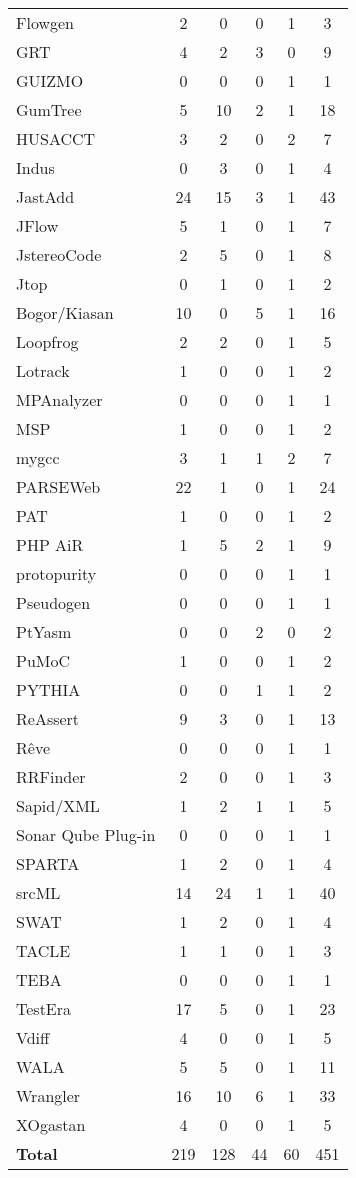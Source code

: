 \begin{longtable}{ l c c c c c }
   Flowgen & 2 & 0 & 0 & 1 & 3 \\
   GRT & 4 & 2 & 3 & 0 & 9 \\
   GUIZMO & 0 & 0 & 0 & 1 & 1 \\
   GumTree & 5 & 10 & 2 & 1 & 18 \\
   HUSACCT & 3 & 2 & 0 & 2 & 7 \\
   Indus & 0 & 3 & 0 & 1 & 4 \\
   JastAdd & 24 & 15 & 3 & 1 & 43 \\
   JFlow & 5 & 1 & 0 & 1 & 7 \\
   JstereoCode & 2 & 5 & 0 & 1 & 8 \\
   Jtop & 0 & 1 & 0 & 1 & 2 \\
   Bogor/Kiasan & 10 & 0 & 5 & 1 & 16 \\
   Loopfrog & 2 & 2 & 0 & 1 & 5 \\
   Lotrack & 1 & 0 & 0 & 1 & 2 \\
   MPAnalyzer & 0 & 0 & 0 & 1 & 1 \\
   MSP & 1 & 0 & 0 & 1 & 2 \\
   mygcc & 3 & 1 & 1 & 2 & 7 \\
   PARSEWeb & 22 & 1 & 0 & 1 & 24 \\
   PAT & 1 & 0 & 0 & 1 & 2 \\
   PHP AiR & 1 & 5 & 2 & 1 & 9 \\
   protopurity & 0 & 0 & 0 & 1 & 1 \\
   Pseudogen & 0 & 0 & 0 & 1 & 1 \\
   PtYasm & 0 & 0 & 2 & 0 & 2 \\
   PuMoC & 1 & 0 & 0 & 1 & 2 \\
   PYTHIA & 0 & 0 & 1 & 1 & 2 \\
   ReAssert & 9 & 3 & 0 & 1 & 13 \\
   Rêve & 0 & 0 & 0 & 1 & 1 \\
   RRFinder & 2 & 0 & 0 & 1 & 3 \\
   Sapid/XML & 1 & 2 & 1 & 1 & 5 \\
   Sonar Qube Plug-in & 0 & 0 & 0 & 1 & 1 \\
   SPARTA & 1 & 2 & 0 & 1 & 4 \\
   srcML & 14 & 24 & 1 & 1 & 40 \\
   SWAT & 1 & 2 & 0 & 1 & 4 \\
   TACLE & 1 & 1 & 0 & 1 & 3 \\
   TEBA & 0 & 0 & 0 & 1 & 1 \\
   TestEra & 17 & 5 & 0 & 1 & 23 \\
   Vdiff & 4 & 0 & 0 & 1 & 5 \\
   WALA & 5 & 5 & 0 & 1 & 11 \\
   Wrangler & 16 & 10 & 6 & 1 & 33 \\
   XOgastan & 4 & 0 & 0 & 1 & 5 \\
  \hline
  {\bf Total} & 219 & 128 & 44 & 60 & 451 \\
\end{longtable}


